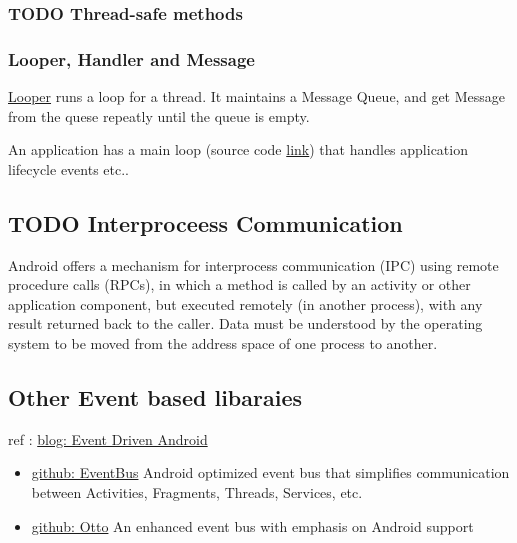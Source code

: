 \subsubsection{{\bfseries\sffamily TODO} Thread-safe methods}

\subsubsection{Looper, Handler and Message}

\href{https://developer.android.com/reference/android/os/Looper.htm}{Looper}
runs a loop for a thread. It maintains a Message Queue, and get Message from the
quese repeatly until the queue is empty. 

An application has a main loop (source code
\href{https://github.com/android/platform_frameworks_base/blob/c29fff50322599f53feadf9cf87df9956c9ac44e/core/java/android/app/ActivityThread.java#L6124}{link})
that handles application lifecycle events etc..


\subsection{{\bfseries\sffamily TODO} Interproceess Communication}
\label{sec:orgheadline5}
Android offers a mechanism for interprocess communication (IPC) using remote
procedure calls (RPCs), in which a method is called by an activity or other
application component, but executed remotely (in another process), with any
result returned back to the caller. Data must be understood by the operating
system to be moved from the address space of one process to another.


\subsection{Other Event based libaraies}
\label{sec:orgheadline6}
ref : \href{http://wale.oyediran.me/2015/07/16/event-driven-android/}{blog: Event Driven Android}

\begin{itemize}
\item \href{http://greenrobot.github.io/EventBus/}{github: EventBus} Android optimized event bus that simplifies communication
between Activities, Fragments, Threads, Services, etc.
\item \href{http://square.github.io/otto/}{github: Otto} An enhanced event bus with emphasis on Android support
\end{itemize}


